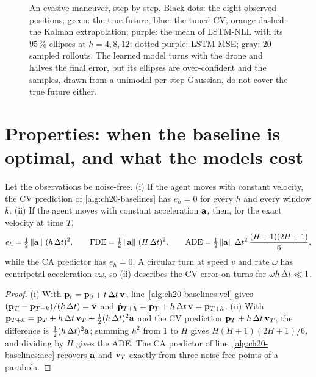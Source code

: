 \begin{figure}[tb]
  \centering
  \caption{An evasive maneuver, step by step. Black dots: the eight
  observed positions; green: the true future; blue: the tuned CV; orange
  dashed: the Kalman extrapolation; purple: the mean of LSTM-NLL with its
  $95\,\%$ ellipses at $h = 4, 8, 12$; dotted purple: LSTM-MSE; gray: $20$
  sampled rollouts. The learned model turns with the drone and halves the
  final error, but its ellipses are over-confident and the samples, drawn
  from a unimodal per-step Gaussian, do not cover the true future either.}
  \label{fig:ch20-example}
\end{figure}

\section[Properties]{Properties: when the baseline is optimal, and what the models cost}
\label{sec:ch20-properties}

\begin{proposition}
\label{thm:ch20-cv-error}
Let the observations be noise-free. (i) If the agent moves with constant
velocity, the CV prediction of \cref{alg:ch20-baselines} has $e_h = 0$ for
every $h$ and every window $k$. (ii) If the agent moves with constant
acceleration $\mathbf{a}$, then, for the exact velocity at time $T$,
\[
  e_h = \tfrac{1}{2}\left\lVert \mathbf{a} \right\rVert\,(h\,\Delta t)^2, \qquad
  \mathrm{FDE} = \tfrac{1}{2}\left\lVert \mathbf{a} \right\rVert\,(H\,\Delta t)^2, \qquad
  \mathrm{ADE} = \tfrac{1}{2}\left\lVert \mathbf{a} \right\rVert\,\Delta t^2\,\frac{(H+1)(2H+1)}{6},
\]
while the CA predictor has $e_h = 0$. A circular turn at speed $v$ and rate
$\omega$ has centripetal acceleration $v\omega$, so (ii) describes the CV
error on turns for $\omega h\,\Delta t \ll 1$.
\end{proposition}
\begin{proof}
(i) With $\mathbf{p}_t = \mathbf{p}_0 + t\,\Delta t\,\mathbf{v}$, line~\ref{alg:ch20-baselines:vel}
gives $(\mathbf{p}_T - \mathbf{p}_{T-k})/(k\,\Delta t) = \mathbf{v}$ and $\hat{\mathbf{p}}_{T+h} = \mathbf{p}_T +
h\,\Delta t\,\mathbf{v} = \mathbf{p}_{T+h}$. (ii) With $\mathbf{p}_{T+h} = \mathbf{p}_T + h\,\Delta t\,\mathbf{v}_T +
\tfrac12 (h\,\Delta t)^2\mathbf{a}$ and the CV prediction $\mathbf{p}_T + h\,\Delta t\,\mathbf{v}_T$, the
difference is $\tfrac12 (h\,\Delta t)^2\mathbf{a}$; summing $h^2$ from $1$ to $H$ gives
$H(H+1)(2H+1)/6$, and dividing by $H$ gives the ADE. The CA predictor of
line~\ref{alg:ch20-baselines:acc} recovers $\mathbf{a}$ and $\mathbf{v}_T$ exactly from
three noise-free points of a parabola.
\end{proof}

